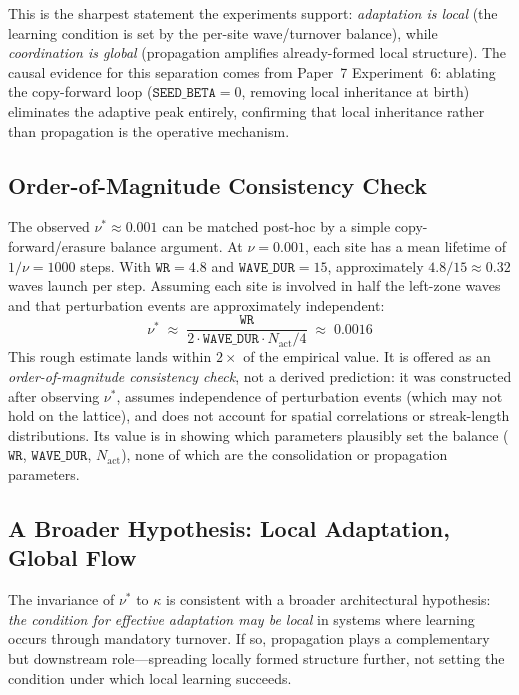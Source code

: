 \documentclass[11pt]{article}
\theoremstyle{remark}
\begin{document}
This is the sharpest statement the experiments support: \emph{adaptation is local}
(the learning condition is set by the per-site wave/turnover balance), while
\emph{coordination is global} (propagation amplifies already-formed local structure).
The causal evidence for this separation comes from Paper~7 Experiment~6: ablating
the copy-forward loop ($\mathtt{SEED\_BETA} = 0$, removing local inheritance at
birth) eliminates the adaptive peak entirely, confirming that local inheritance
rather than propagation is the operative mechanism.

\subsection{Order-of-Magnitude Consistency Check}

The observed $\nu^* \approx 0.001$ can be matched post-hoc by a simple
copy-forward/erasure balance argument. At $\nu = 0.001$, each site has a mean
lifetime of $1/\nu = 1000$ steps. With $\mathtt{WR} = 4.8$ and
$\mathtt{WAVE\_DUR} = 15$, approximately $4.8/15 \approx 0.32$ waves launch per
step. Assuming each site is involved in half the left-zone waves and that
perturbation events are approximately independent:
\begin{equation}
  \nu^* \;\approx\; \frac{\mathtt{WR}}{2 \cdot \mathtt{WAVE\_DUR}
    \cdot N_{\text{act}}/4} \;\approx\; 0.0016
  \label{eq:balance}
\end{equation}
This rough estimate lands within $2\times$ of the empirical value. It is offered
as an \emph{order-of-magnitude consistency check}, not a derived prediction:
it was constructed after observing $\nu^*$, assumes independence of perturbation
events (which may not hold on the lattice), and does not account for spatial
correlations or streak-length distributions. Its value is in showing which
parameters plausibly set the balance ($\mathtt{WR}$, $\mathtt{WAVE\_DUR}$,
$N_{\text{act}}$), none of which are the consolidation or propagation parameters.

\subsection{A Broader Hypothesis: Local Adaptation, Global Flow}
\label{sec:local_global}

The invariance of $\nu^*$ to $\kappa$ is consistent with a broader architectural
hypothesis: \emph{the condition for effective adaptation may be local} in systems
where learning occurs through mandatory turnover. If so, propagation plays a
complementary but downstream role---spreading locally formed structure further,
not setting the condition under which local learning succeeds.
\end{document}
